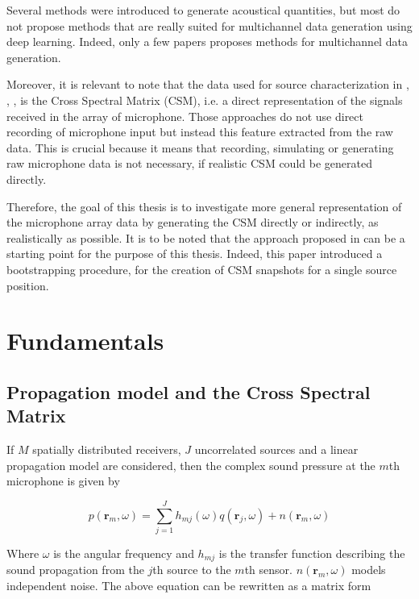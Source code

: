 \documentclass[11pt,a4paper,twoside]{report}
\begin{document}
Several methods were introduced to generate acoustical quantities, but most do not propose methods that are really suited for multichannel data generation using deep learning. Indeed, only a few papers proposes methods for multichannel data generation. 

Moreover, it is relevant to note that the data used for source characterization in \cite{castellini2021neural}, \cite{lee2021deep}, \cite{ma2019phased}, \cite{xu2021deep} is the Cross Spectral Matrix (CSM), i.e. a direct representation of the signals received in the array of microphone. Those approaches do not use direct recording of microphone input but instead this feature extracted from the raw data. This is crucial because it means that recording, simulating or generating raw microphone data is not necessary, if realistic CSM could be generated directly. 

Therefore, the goal of this thesis is to investigate more general representation of the microphone array data by generating the CSM directly or indirectly, as realistically as possible. It is to be noted that the approach proposed in \cite{gerstoft2020parametric} can be a starting point for the purpose of this thesis. Indeed, this paper introduced a bootstrapping procedure, for the creation of CSM snapshots for a single source position.

\chapter{Fundamentals}

\section{Propagation model and the Cross Spectral Matrix}

If $M$ spatially distributed receivers, $J$ uncorrelated sources and a linear propagation model are considered, then the complex sound pressure at the $m$th microphone is given by

\begin{equation}
    p(\mathbf{r}_m, \omega) = \sum_{j = 1}^{J} h_{mj}(\omega)q(\mathbf{r}_j, \omega) + n(\mathbf{r}_m, \omega)
\end{equation}

Where $\omega$ is the angular frequency and $h_{mj}$ is the transfer function  describing the sound propagation from the $j$th source to the $m$th sensor. $n(\mathbf{r}_m, \omega)$ models independent noise. The above equation can be rewritten as a matrix form
\end{document}
